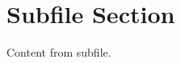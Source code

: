 \documentclass[../main.tex]{subfiles}
\begin{document}
\section{Subfile Section}
\label{sec:subfile}
Content from subfile.
\end{document}
